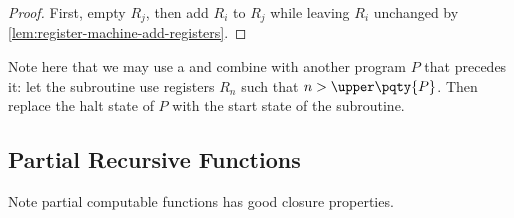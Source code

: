 \begin{proof}
    First, empty \(R_j\), then add \(R_i\) to \(R_j\) while leaving \(R_i\) unchanged by \autoref{lem:register-machine-add-registers}.
\end{proof}

\begin{remark}
    Note here that we may use a  and combine with another program \(P\) that precedes it: let the subroutine use registers \(R_n\) such that \(n > \upper\pqty{P}\). Then replace the halt state of \(P\) with the start state of the subroutine.
\end{remark}

\subsection{Partial Recursive Functions}

Note partial computable functions has good closure properties.

